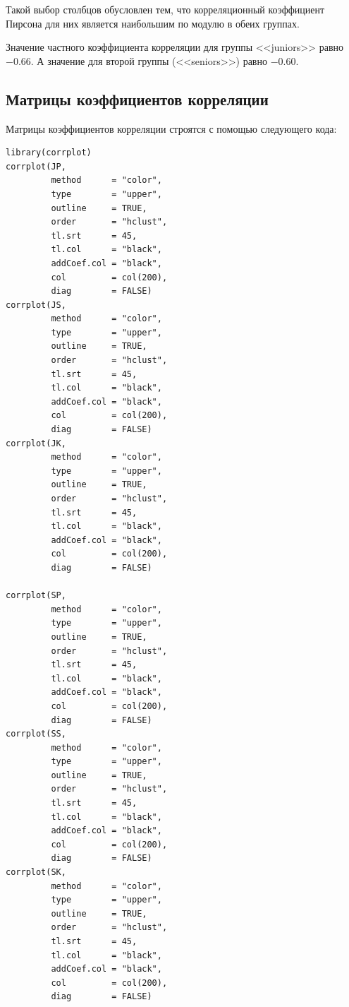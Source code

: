 Такой выбор столбцов обусловлен тем, что корреляционный коэффициент Пирсона для них является наибольшим по модулю в обеих группах.

Значение частного коэффициента корреляции для группы <<juniors>> равно $-0.66$. А значение для второй группы (<<seniors>>) равно $-0.60$.


\subsection{Матрицы коэффициентов корреляции}

Матрицы коэффициентов корреляции строятся с помощью следующего кода:

\begin{verbatim}
library(corrplot)
corrplot(JP, 
         method      = "color", 
         type        = "upper", 
         outline     = TRUE, 
         order       = "hclust", 
         tl.srt      = 45,
         tl.col      = "black",
         addCoef.col = "black", 
         col         = col(200), 
         diag        = FALSE)
corrplot(JS, 
         method      = "color", 
         type        = "upper", 
         outline     = TRUE, 
         order       = "hclust", 
         tl.srt      = 45,
         tl.col      = "black",
         addCoef.col = "black", 
         col         = col(200), 
         diag        = FALSE)
corrplot(JK, 
         method      = "color", 
         type        = "upper", 
         outline     = TRUE, 
         order       = "hclust", 
         tl.srt      = 45,
         tl.col      = "black",
         addCoef.col = "black", 
         col         = col(200), 
         diag        = FALSE)

corrplot(SP, 
         method      = "color", 
         type        = "upper", 
         outline     = TRUE, 
         order       = "hclust", 
         tl.srt      = 45,
         tl.col      = "black",
         addCoef.col = "black", 
         col         = col(200), 
         diag        = FALSE)
corrplot(SS, 
         method      = "color", 
         type        = "upper", 
         outline     = TRUE, 
         order       = "hclust", 
         tl.srt      = 45,
         tl.col      = "black",
         addCoef.col = "black", 
         col         = col(200), 
         diag        = FALSE)
corrplot(SK, 
         method      = "color", 
         type        = "upper", 
         outline     = TRUE, 
         order       = "hclust", 
         tl.srt      = 45,
         tl.col      = "black",
         addCoef.col = "black", 
         col         = col(200), 
         diag        = FALSE)
\end{verbatim}

